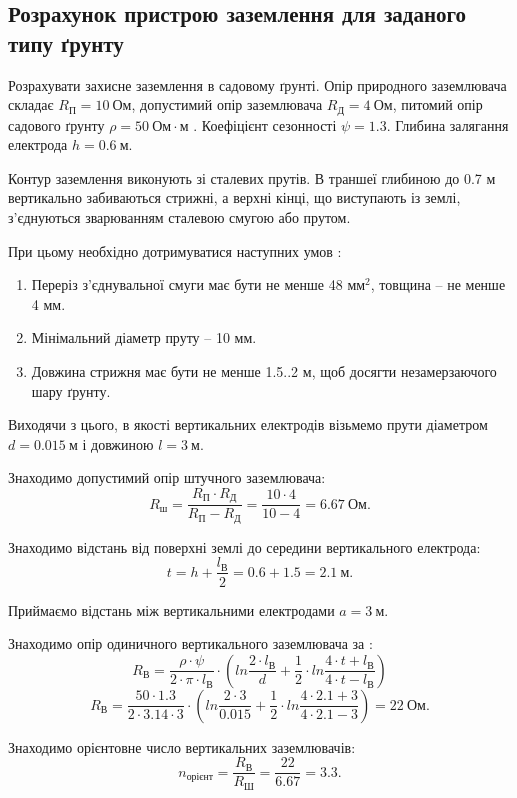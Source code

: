 \documentclass[a4paper,12pt]{article}
\begin{document}
\subsection{Розрахунок пристрою заземлення для заданого типу ґрунту}
Розрахувати захисне заземлення в садовому ґрунті. Опір природного заземлювача складає $R_\text{П}=10\ \text{Ом}$, допустимий опір заземлювача $R_\text{Д}=4\ \text{Ом}$, питомий опір садового ґрунту $\rho=50\ \text{Ом}\cdot\text{м}$ \cite{burakova}. Коефіцієнт сезонності $\psi = 1.3$. Глибина залягання електрода $h = 0.6\ \text{м}$.

Контур заземлення виконують зі сталевих прутів. В траншеї глибиною до 0.7 м вертикально забиваються стрижні, а верхні кінці, що виступають із землі, з’єднуються зварюванням сталевою смугою або прутом.

При цьому необхідно дотримуватися наступних умов \cite{dzunzuk}:
\begin{enumerate}
\item Переріз з’єднувальної смуги має бути не менше 48 $\text{мм}^2$, товщина -- не менше 4 мм.
\item Мінімальний діаметр пруту -- 10 мм.
\item Довжина стрижня має бути не менше 1.5..2 м, щоб досягти незамерзаючого шару ґрунту.
\end{enumerate}

Виходячи з цього, в якості вертикальних електродів візьмемо прути діаметром $d = 0.015\ \text{м}$ і довжиною $l = 3\ \text{м}$.

Знаходимо допустимий опір штучного заземлювача:
\[
R_\text{ш} = \frac{R_\text{П} \cdot R_\text{Д}}{R_\text{П} - R_\text{Д}} = 
\frac{10 \cdot 4}{10 - 4} = 6.67\ \text{Ом}.
\]

Знаходимо відстань від поверхні землі до середини вертикального електрода:
\[
t = h + \frac{l_\text{В}}{2} = 0.6 + 1.5 = 2.1\ \text{м}.
\]

Приймаємо відстань між вертикальними електродами $a = 3\ \text{м}$.

Знаходимо опір одиничного вертикального заземлювача за \cite{dzunzuk}:
\[
R_\text{В} = \frac{\rho\cdot\psi}{2\cdot\pi\cdot l_\text{В}} \cdot \left( ln \frac{2\cdot l_\text{В}}{d} + \frac{1}{2}\cdot ln \frac{4 \cdot t + l_\text{В}}{4 \cdot t - l_\text{В}} \right)
\]
\[
R_\text{В} = \frac{50\cdot1.3}{2\cdot3.14\cdot 3} \cdot \left( ln \frac{2\cdot 3}{0.015} + \frac{1}{2}\cdot ln \frac{4 \cdot 2.1 + 3}{4 \cdot 2.1 - 3} \right) = 22\ \text{Ом}.
\]

Знаходимо орієнтовне число вертикальних заземлювачів:
\[
n_\text{орієнт} = \frac{R_\text{В}}{R_\text{Ш}} = \frac{22}{6.67} = 3.3.
\]
\end{document}
